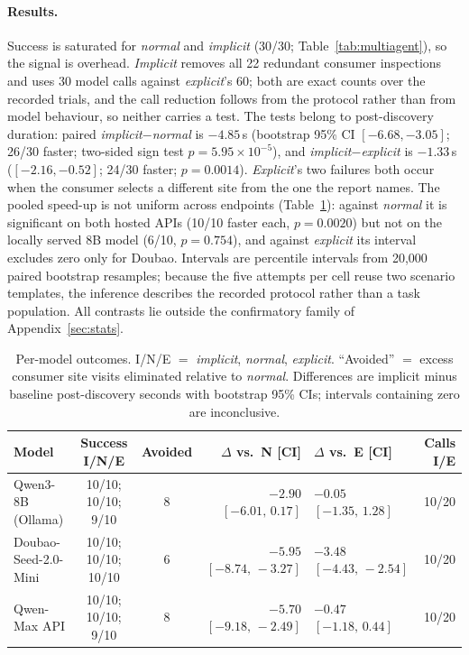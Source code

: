 \documentclass[letterpaper]{article} %
\newcommand{\appref}[1]{Appendix~\ref{#1}}
\begin{document}
\paragraph{Results.}  Success is saturated for \emph{normal} and
\emph{implicit} (30/30; Table~\ref{tab:multiagent}), so the signal is overhead.  \emph{Implicit} removes
all 22 redundant consumer inspections and uses 30 model calls against
\emph{explicit}'s 60; both are exact counts over the recorded trials, and the
call reduction follows from the protocol rather than from model behaviour, so
neither carries a test.  The tests belong to post-discovery duration: paired
\emph{implicit}$-$\emph{normal} is $-4.85$\,s (bootstrap 95\% CI
$[-6.68,-3.05]$; 26/30 faster; two-sided sign test
$p{=}5.95{\times}10^{-5}$), and \emph{implicit}$-$\emph{explicit} is
$-1.33$\,s ($[-2.16,-0.52]$; 24/30 faster; $p{=}0.0014$).  \emph{Explicit}'s
two failures both occur when the consumer selects a different site from the
one the report names.  The pooled speed-up is not uniform across endpoints
(Table~\ref{tab:kr_permodel}): against \emph{normal} it is significant on both
hosted APIs (10/10 faster each, $p{=}0.0020$) but not on the locally served 8B
model (6/10, $p{=}0.754$), and against \emph{explicit} its interval excludes
zero only for Doubao.  Intervals are percentile intervals from 20{,}000 paired
bootstrap resamples; because the five attempts per cell reuse two scenario
templates, the inference describes the recorded protocol rather than a task
population.  All contrasts lie outside the confirmatory family of
\appref{sec:stats}.

\begin{table}[htbp]
\centering
\caption{Per-model outcomes.  I/N/E $=$ \emph{implicit}, \emph{normal},
\emph{explicit}.  ``Avoided'' $=$ excess consumer site visits eliminated
relative to \emph{normal}.  Differences are implicit minus baseline
post-discovery seconds with bootstrap 95\% CIs; intervals containing zero are
inconclusive.}
\label{tab:kr_permodel}
\footnotesize\setlength{\tabcolsep}{3pt}
\begin{tabular}{@{}lccrlr@{}}
\toprule
Model & Success I/N/E & Avoided & $\Delta$ vs.\ N [CI] & $\Delta$ vs.\ E [CI] & Calls I/E \\
\midrule
Qwen3-8B (Ollama)    & 10/10; 10/10; 9/10 & 8 & $-2.90$ $[-6.01,\,0.17]$  & $-0.05$ $[-1.35,\,1.28]$  & 10/20 \\
Doubao-Seed-2.0-Mini & 10/10; 10/10; 10/10 & 6 & $-5.95$ $[-8.74,\,-3.27]$ & $-3.48$ $[-4.43,\,-2.54]$ & 10/20 \\
Qwen-Max API         & 10/10; 10/10; 9/10 & 8 & $-5.70$ $[-9.18,\,-2.49]$ & $-0.47$ $[-1.18,\,0.44]$  & 10/20 \\
\bottomrule
\end{tabular}
\end{table}
\end{document}
